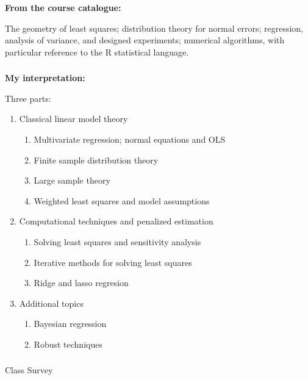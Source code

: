 \begin{frame}[fragile] \frametitle{}

{\bf From the course catalogue:}

The geometry of least squares; distribution theory for normal errors; regression, analysis of variance, and designed experiments; numerical algorithms, with particular reference to the R statistical language.

\end{frame}

\begin{frame}[fragile] \frametitle{}

{\bf My interpretation:}

Three parts: \pause
\begin{enumerate}
\item Classical linear model theory \pause
\begin{enumerate}
\item Multivariate regression; normal equations and OLS
\item Finite sample distribution theory
\item Large sample theory
\item Weighted least squares and model assumptions \pause
\end{enumerate}
\item Computational techniques and penalized estimation \pause
\begin{enumerate}
\item Solving least squares and sensitivity analysis
\item Iterative methods for solving least squares
\item Ridge and lasso regresion \pause
\end{enumerate}
\item Additional topics \pause
\begin{enumerate}
\item Bayesian regression
\item Robust techniques
\end{enumerate}
\end{enumerate}

\end{frame}

\begin{frame}[fragile] \frametitle{}

\begin{flushright}
{\color{yaleblue}\sc\fontsize{1cm}{0cm}\selectfont Class Survey}
\end{flushright}

\end{frame}

